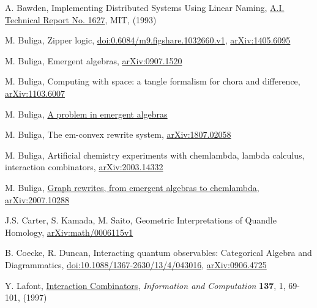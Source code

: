 \documentclass[]{article}
\begin{document}
\begin{thebibliography}{99}

  A. Bawden,  Implementing Distributed Systems Using Linear Naming,  \href{https://dspace.mit.edu/handle/1721.1/7085}{A.I. Technical Report No. 1627}, MIT, (1993)

 M. Buliga, Zipper logic, \href{https://doi.org/10.6084/m9.figshare.1032660.v1}{doi:0.6084/m9.figshare.1032660.v1}, \href{https://arxiv.org/abs/1405.6095}{arXiv:1405.6095} 

 M. Buliga, Emergent algebras, \href{https://arxiv.org/abs/0907.1520}{arXiv:0907.1520}

 M. Buliga, Computing with space: a tangle formalism for chora and difference, \href{https://arxiv.org/abs/1103.6007}{arXiv:1103.6007}

 M. Buliga, \href{https://mbuliga.github.io/colin/colin.pdf}{A problem in
emergent algebras}

 M. Buliga, The em-convex rewrite system, \href{https://arxiv.org/abs/1807.02058}{arXiv:1807.02058}

 M. Buliga, Artificial chemistry experiments with chemlambda, lambda calculus, interaction combinators, 
\href{https://arxiv.org/abs/2003.14332}{arXiv:2003.14332}

  M. Buliga, \href{https://mbuliga.github.io/quinegraphs/history-of-chemlambda.html}{Graph rewrites, from emergent algebras to chemlambda}, \href{https://arxiv.org/abs/2007.10288}{arXiv:2007.10288}

 J.S. Carter, S. Kamada, M. Saito, Geometric Interpretations of Quandle Homology, \href{https://arxiv.org/abs/math/0006115v1}{arXiv:math/0006115v1}


 B. Coecke, R. Duncan, Interacting quantum observables: Categorical Algebra and Diagrammatics, \href{https://dx.doi.org/10.1088/1367-2630/13/4/043016}{doi:10.1088/1367-2630/13/4/043016}, \href{https://arxiv.org/abs/0906.4725}{arXiv:0906.4725}

  Y.  Lafont,  \href{https://pdfs.semanticscholar.org/6cfe/09aa6e5da6ce98077b7a048cb1badd78cc76.pdf}{Interaction
Combinators}, {\it Information  and  Computation} {\bf 137},  1,  69-101, (1997)


\end{thebibliography}
\end{document}
